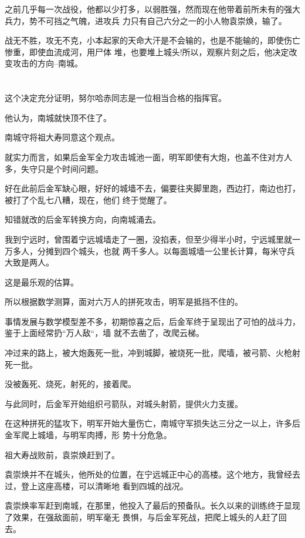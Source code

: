 \documentclass[11pt,a4paper,onecolumn]{article}
\begin{document}
之前几乎每一次战役，他都以少打多，以弱胜强，然而现在他带着前所未有的强大兵力，势不可挡之气魄，进攻兵
力只有自己六分之一的小人物袁崇焕，输了。

战无不胜，攻无不克，小本起家的天命大汗是不会输的，也是不能输的，即使伤亡惨重，即使血流成河，用尸体
堆，也要堆上城头!所以，观察片刻之后，他决定改变攻击的方向--南城。

\section[\thesection]{}

这个决定充分证明，努尔哈赤同志是一位相当合格的指挥官。

他认为，南城就快顶不住了。

南城守将祖大寿同意这个观点。

就实力而言，如果后金军全力攻击城池一面，明军即使有大炮，也盖不住对方人多，失守只是个时间问题。

好在此前后金军缺心眼，好好的城墙不去，偏要往夹脚里跑，西边打，南边也打，被打了个乱七八糟，现在，他们
终于觉醒了。

知错就改的后金军转换方向，向南城涌去。

我到宁远时，曾围着宁远城墙走了一圈，没掐表，但至少得半小时，宁远城里就一万多人，分摊到四个城头，也就
两千多人。以每面城墙一公里长计算，每米守兵大致是两人。

这是最乐观的估算。

所以根据数学测算，面对六万人的拼死攻击，明军是抵挡不住的。

事情发展与数学模型差不多，初期惊喜之后，后金军终于呈现出了可怕的战斗力，鉴于上面经常扔``万人敌``，墙
就不去凿了，改爬云梯。

冲过来的路上，被大炮轰死一批，冲到城脚，被烧死一批，爬墙，被弓箭、火枪射死一批。

没被轰死、烧死，射死的，接着爬。

与此同时，后金军开始组织弓箭队，对城头射箭，提供火力支援。

在这种拼死的猛攻下，明军开始大量伤亡，南城守军损失达三分之一以上，许多后金军爬上城墙，与明军肉搏，形
势十分危急。

祖大寿战败前，袁崇焕赶到了。

袁崇焕并不在城头，他所处的位置，在宁远城正中心的高楼。这个地方，我曾经去过，登上这座高楼，可以清晰地
看到四城的战况。

袁崇焕率军赶到南城，在那里，他投入了最后的预备队。长久以来的训练终于显现了效果，在强敌面前，明军毫无
畏惧，与后金军死战，把爬上城头的人赶了回去。
\end{document}
